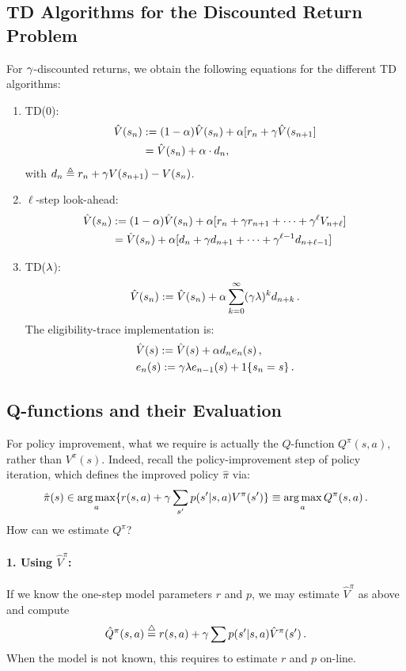\subsection{TD Algorithms for the Discounted Return Problem}

For $\gamma$-discounted returns, we obtain the following equations for the
different TD algorithms:
\begin{enumerate}
  \item TD(0):
\begin{align*}
\hat V(s_n) & := (1-\alpha) \hat V(s_n) + \alpha [ r_n +
\gamma\hat V (s_{n+1}] \\
& = \hat V (s_n) + \alpha \cdot d_n,
\end{align*}
with $d_n \triangleq r_n + \gamma V (s_{n+1}) - V(s_n)$.

  \item $\ell$-step look-ahead:
\begin{align*}
\hat V(s_n) & := (1-\alpha) \hat V(s_n) + \alpha [r_n + \gamma r_{n+1}
+ \cdots + \gamma^\ell V_{n+\ell}] \\
& = \hat V(s_n) + \alpha [d_n + \gamma d_{n+1} + \cdots +
\gamma^{\ell-1} d_{n+\ell-1}]
\end{align*}
  \item TD($\lambda$):
$$
\hat V(s_n) := \hat V (s_n) + \alpha \sum_{k=0}^\infty (\gamma \lambda )^k
d_{n+k}\,.
$$
The eligibility-trace implementation is:
\begin{align*}
& \hat V(s) := \hat V(s) + \alpha d_n e_n (s) \,, \\
& e_n(s) := \gamma\lambda e_{n-1}(s) +1\{s_n=s\} \,.
\end{align*}
\end{enumerate}

\subsection{Q-functions and their Evaluation}\label{ss:Q_eval}

For policy improvement, what we require is actually the
$Q$-function $Q^{\pi}(s,a)$, rather than $V^{\pi}(s)$.
Indeed, recall the policy-improvement step of policy iteration, which defines
the improved policy $\hat\pi$ via:
$$
\hat \pi(s) \in \argmax_a \{r(s,a) + \ga \sum_{s'} p(s'|s,a) V^{\pi} (s') \}
 \equiv \argmax_a Q^{\pi}(s,a)\,.
$$
How can we estimate $Q^{\pi}$?

\paragraph{1. Using $\hat V^{\pi}$:}
If we know the one-step model parameters $r$ and $p$,
we may estimate $\hat V^{\pi}$ as above and compute
$$
\hat Q^{\pi} (s,a) \stackrel{\bigtriangleup}{=} r(s,a) +\gamma \sum p(s'|s,a) \hat V^{\pi}(s')\,.
$$
When the model is not known, this requires to estimate $r$ and $p$ on-line.

